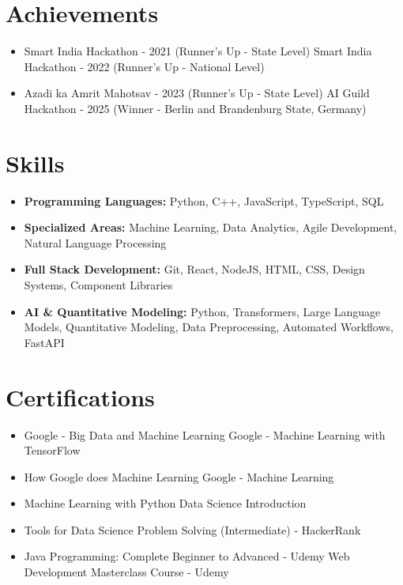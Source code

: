 \documentclass[a4paper,10pt]{article}
\begin{document}
\section*{Achievements}
\begin{itemize}
\item Smart India Hackathon - 2021 (Runner's Up - State Level) \hfill Smart India Hackathon - 2022 (Runner's Up - National Level)
\item Azadi ka Amrit Mahotsav - 2023 (Runner's Up - State Level) \hfill AI Guild Hackathon - 2025 (Winner - Berlin and Brandenburg State, Germany)
\end{itemize}

\section*{Skills}
\begin{itemize}
  \item \textbf{Programming Languages:} Python, C++, JavaScript, TypeScript, SQL
  \item \textbf{Specialized Areas:} Machine Learning, Data Analytics, Agile Development, Natural Language Processing
  \item \textbf{Full Stack Development:} Git, React, NodeJS, HTML, CSS, Design Systems, Component Libraries
  \item \textbf{AI \& Quantitative Modeling:} Python, Transformers, Large Language Models, Quantitative Modeling, Data Preprocessing, Automated Workflows, FastAPI
\end{itemize}

\section*{Certifications}
\begin{itemize}
\item Google - Big Data and Machine Learning \hfill Google - Machine Learning with TensorFlow
\item How Google does Machine Learning \hfill Google - Machine Learning
\item Machine Learning with Python \hfill Data Science Introduction
\item Tools for Data Science \hfill Problem Solving (Intermediate) - HackerRank
\item Java Programming: Complete Beginner to Advanced - Udemy \hfill Web Development Masterclass Course - Udemy
\end{itemize}
\end{document}
